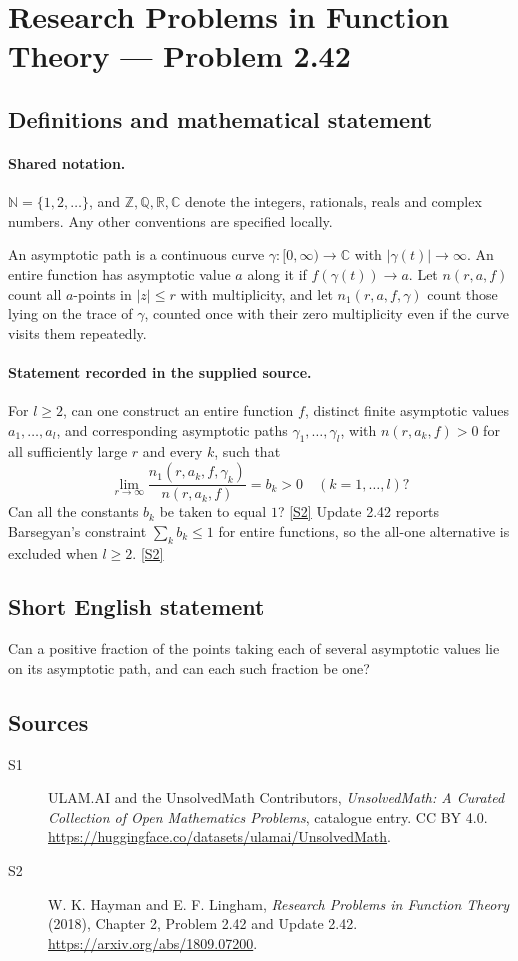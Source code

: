 \documentclass[11pt]{article}
\newcommand{\sref}[2]{\hyperlink{source:#1:#2}{[S#2]}}
\begin{document}
\section{Research Problems in Function Theory — Problem 2.42}\label{statement}

\subsection{Definitions and mathematical statement}

\paragraph{Shared notation.}$\mathbb N=\{1,2,\ldots\}$, and $\mathbb Z,\mathbb Q,\mathbb R,\mathbb C$ denote the integers, rationals, reals and complex numbers. Any other conventions are specified locally.


An asymptotic path is a continuous curve $\gamma:[0,\infty)\to\mathbb C$ with $|\gamma(t)|\to\infty$. An entire function has asymptotic value $a$ along it if $f(\gamma(t))\to a$. Let $n(r,a,f)$ count all $a$-points in $|z|\le r$ with multiplicity, and let $n_1(r,a,f,\gamma)$ count those lying on the trace of $\gamma$, counted once with their zero multiplicity even if the curve visits them repeatedly.

\paragraph{Statement recorded in the supplied source.}
For $l\ge2$, can one construct an entire function $f$, distinct finite asymptotic values $a_1,\ldots,a_l$, and corresponding asymptotic paths $\gamma_1,\ldots,\gamma_l$, with $n(r,a_k,f)>0$ for all sufficiently large $r$ and every $k$, such that
\[\lim_{r\to\infty}\frac{n_1(r,a_k,f,\gamma_k)}{n(r,a_k,f)}=b_k>0
\quad(k=1,\ldots,l)?\]
Can all the constants $b_k$ be taken to equal $1$? \sref{statement}{2}
Update 2.42 reports Barsegyan's constraint $\sum_k b_k\le1$ for entire functions, so the all-one alternative is excluded when $l\ge2$. \sref{statement}{2}
\subsection{Short English statement}
Can a positive fraction of the points taking each of several asymptotic values lie on its asymptotic path, and can each such fraction be one?
\subsection{Sources}
\begin{description}
\item[\hypertarget{source:statement:1}{S1}] ULAM.AI and the UnsolvedMath Contributors, \emph{UnsolvedMath: A Curated Collection of Open Mathematics Problems}, catalogue entry. CC BY 4.0. \url{https://huggingface.co/datasets/ulamai/UnsolvedMath}.
\item[\hypertarget{source:statement:2}{S2}] W. K. Hayman and E. F. Lingham, \emph{Research Problems in Function Theory} (2018), Chapter 2, Problem 2.42 and Update 2.42. \url{https://arxiv.org/abs/1809.07200}.
\end{description}
\label{end:statement}
\end{document}

